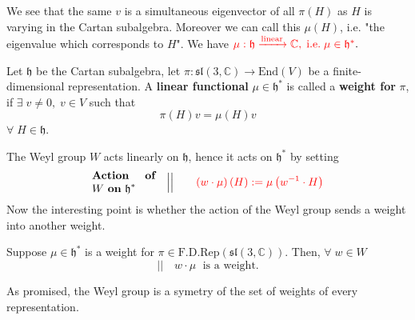 \documentclass[../main.tex]{subfiles}
\begin{document}
We see that the same $v$ is a simultaneous eigenvector of all $\pi(H)$ as $H$ is varying in the Cartan subalgebra. Moreover we can call this $\mu(H)$, i.e. "the eigenvalue which corresponds to $H$". We have 
\(
{\color{red}\mu:\mathfrak{h}\xrightarrow{\textrm{linear}}\mathbb{C},\;\textrm{i.e.}\; \mu \in\mathfrak{h}^\ast}.
\)
\begin{definition}Let $\mathfrak{h}$ be the Cartan subalgebra, let $\pi:\mathfrak{sl}(3,\mathbb{C})\to\textrm{End}(V)$ be a finite-dimensional representation. A \textbf{linear functional} $\mu\in\mathfrak{h^\ast}$ is called a \textbf{weight for} $\pi$, if $\exists\;v\neq 0,\;v\in V$ such that
\[
\pi(H)v=\mu(H)v 
\]
$\forall\;H\in\mathfrak{h}$.
\end{definition}
The Weyl group $W$ acts linearly on $\mathfrak{h}$, hence it acts on $\mathfrak{h}^\ast$ by setting
\[
\text{\centering\parbox{2cm}{\textbf{Action of} $W$ \textbf{on} $\mathfrak{h}^\ast$}}\quad \Big|\Big|\qquad {\color{red}\left(w\cdot\mu\right)(H):=\mu\left(w^{-1}\cdot H\right)}
\]
Now the interesting point is whether the action of the Weyl group sends a weight into another weight.
\begin{theorem}[Weyl]Suppose $\mu\in\mathfrak{h}^\ast$ is a weight for $\pi\in\textrm{F.D.Rep}(\mathfrak{sl}(3,\mathbb{C}))$. Then, $\forall\;w\in W$
\[
\Big|\Big|\quad w\cdot\mu \;\textrm{ is a weight.}
\]
\end{theorem}
As promised, the Weyl group is a symetry of the set of weights of every representation.
\end{document}
